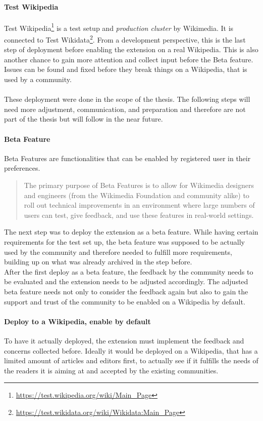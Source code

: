 \paragraph{Test Wikipedia}
Test Wikipedia\footnote{\url{https://test.wikipedia.org/wiki/Main_Page}} is a test setup and \textit{production cluster} by Wikimedia. It is connected to Test Wikidata\footnote{\url{https://test.wikidata.org/wiki/Wikidata:Main_Page}}. From a development perspective, this is the last step of deployment before enabling the extension on a real Wikipedia. This is also another chance to gain more attention and collect input before the Beta feature. Issues can be found and fixed before they break things on a Wikipedia, that is used by a community. \\
\\
These deployment were done in the scope of the thesis. The following steps will need more adjustment, communication, and preparation and therefore are not part of the thesis but will follow in the near future. 

\paragraph{Beta Feature}
Beta Features are functionalities that can be enabled by registered user in their preferences. 
\begin{quotation}
	The primary purpose of Beta Features is to allow for Wikimedia designers and engineers (from the Wikimedia Foundation and community alike) to roll out technical improvements in an environment where large numbers of users can test, give feedback, and use these features in real-world settings.
\end{quotation} \citep{wiki:04}

The next step was to deploy the extension as a beta feature. While having certain requirements for the test set up, the beta feature was supposed to be actually used by the community and therefore needed to fulfill more requirements, building up on what was already archived in the step before. \\
After the first deploy as a beta feature, the feedback by the community needs to be evaluated and the extension needs to be adjusted accordingly. The adjusted beta feature needs not only to consider the feedback again but also to gain the support and trust of the community to be enabled on a Wikipedia by default.

\paragraph{Deploy to a Wikipedia, enable by default}
To have it actually deployed, the extension must implement the feedback and concerns collected before. Ideally it would be deployed on a Wikipedia, that has a limited amount of articles and editors first, to actually see if it fulfills the needs of the readers it is aiming at and accepted by the existing communities. 


